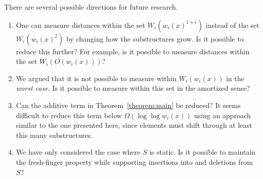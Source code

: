 \documentclass{llncs}
\newcommand{\BigOh}[1]{O\!\left(#1\right)}
\newcommand{\BigOmega}[1]{\Omega\!\left(#1\right)}
\begin{document}
There are several possible directions for future research.

\begin{enumerate}
\item One can measure distances within the set $W_i(w_i(x)^{1+\epsilon})$ instead of the set $W_i(w_i(x)^2)$ by changing how the substructures grow. Is it possible to reduce this further? For example, is it possible to measure distances within the set $W_i(\BigOh{w_i(x)})$?

\item We argued that it is not possible to measure within $W_i(w_i(x))$ in the \emph{worst case}. Is it possible to measure within this set in the amortized sense?

\item Can the additive term in Theorem~\ref{theorem:main} be reduced? It seems difficult to reduce this term below $\BigOmega{\log \log w_i(x)}$ using an approach similar to the one presented here, since elements must shift through at least this many substructures.

\item We have only considered the case where $S$ is static. Is it possible to maintain the fresh-finger property while supporting insertions into and deletions from $S$?
\end{enumerate}





\end{document}
